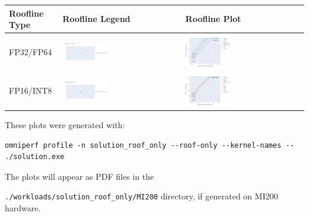\documentclass[
]{article}
\let\oldtexttt\texttt
\renewcommand{\texttt}[1]{
  \colorbox{Light}{\oldtexttt{#1}}
}
\begin{document}
\begin{longtable}[]{@{}lll@{}}
\toprule
Roofline Type & Roofline Legend & Roofline Plot\tabularnewline
\midrule
\endhead
FP32/FP64 &
\includegraphics[width=0.4\textwidth,height=0.4\textheight]{omniperf/launch_parameters/8575851bf3f9ac056a2eae0e721d44cde6e9378a.png} &
\includegraphics[width=0.4\textwidth,height=0.4\textheight]{omniperf/launch_parameters/ff410f6f69cbebe8bb4a9c8661ed8e6dcb35e6bc.png}\tabularnewline
FP16/INT8 &
\includegraphics[width=0.4\textwidth,height=0.4\textheight]{omniperf/launch_parameters/8575851bf3f9ac056a2eae0e721d44cde6e9378a.png} &
\includegraphics[width=0.4\textwidth,height=0.4\textheight]{omniperf/launch_parameters/a31cee3a36401e534a18b717c66f33144d89c7e5.png}\tabularnewline
\bottomrule
\end{longtable}

These plots were generated with:

\begin{Verbatim}
omniperf profile -n solution_roof_only --roof-only --kernel-names -- ./solution.exe
\end{Verbatim}

The plots will appear as PDF files in the
\texttt{./workloads/solution\_roof\_only/MI200} directory, if generated
on MI200 hardware.
\end{document}
